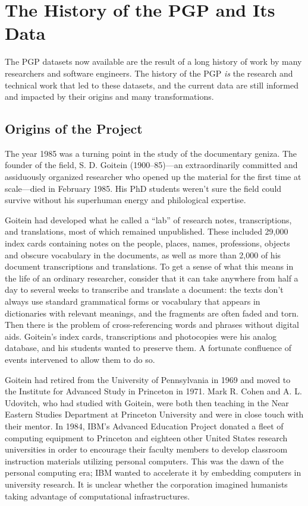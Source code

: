 \documentclass{article}
\begin{document}
\section{The History of the PGP and Its Data}

The PGP datasets now available are the result of a long history of work by many researchers and software engineers. The history of the PGP \textit{is} the research and technical work that led to these datasets, and the current data are still informed and impacted by their origins and many transformations.

\subsection{Origins of the Project}

The year 1985 was a turning point in the study of the documentary geniza. The founder of the field, S. D. Goitein (1900–85)—an extraordinarily committed and assiduously organized researcher who opened up the material for the first time at scale—died in February 1985. His PhD students weren’t sure the field could survive without his superhuman energy and philological expertise. 

Goitein had developed what he called a “lab” of research notes, transcriptions, and translations, most of which remained unpublished. These included 29,000 index cards containing notes on the people, places, names, professions, objects and obscure vocabulary in the documents, as well as more than 2,000 of his document transcriptions and translations. To get a sense of what this means in the life of an ordinary researcher, consider that it can take anywhere from half a day to several weeks to transcribe and translate a document: the texts don't always use standard grammatical forms or vocabulary that appears in dictionaries with relevant meanings, and the fragments are often faded and torn. Then there is the problem of cross-referencing words and phrases without digital aids. Goitein’s index cards, transcriptions and photocopies were his analog database, and his students wanted to preserve them. A fortunate confluence of events intervened to allow them to do so. 

Goitein had retired from the University of Pennsylvania in 1969 and moved to the Institute for Advanced Study in Princeton in 1971. Mark R. Cohen and A. L. Udovitch, who had studied with Goitein, were both then teaching in the Near Eastern Studies Department at Princeton University and were in close touch with their mentor. In 1984, IBM’s Advanced Education Project donated a fleet of computing equipment to Princeton and eighteen other United States research universities in order to encourage their faculty members to develop classroom instruction materials utilizing personal computers. This was the dawn of the personal computing era; IBM wanted to accelerate it by embedding computers in university research. It is unclear whether the corporation imagined humanists taking advantage of computational infrastructures.
\end{document}

